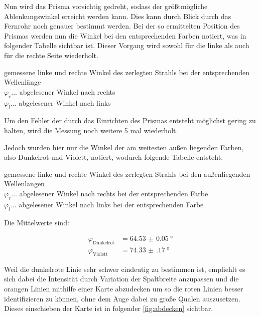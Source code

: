 \documentclass[11pt,ngerman]{scrartcl}
\begin{document}
Nun wird das Prisma vorsichtig gedreht, sodass der größtmögliche
Ablenkungswinkel erreicht werden kann. Dies kann durch Blick durch das Fernrohr
noch genauer bestimmt werden. Bei der so ermittelten Position des Prismas
werden nun die Winkel bei den entsprechenden Farben notiert, was in folgender
Tabelle sichtbar ist. Dieser Vorgang wird sowohl für die linke als auch für die
rechte Seite wiederholt.

\begin{table}[H]
	\caption{gemessene linke und rechte Winkel des zerlegten Strahls bei der entsprechenden Wellenlänge\\ $\varphi_r \dots$ abgelesener Winkel nach rechts \\ $\varphi_l \dots$ abgelesener Winkel nach links}
	\centering
	\label{tab:messalle}
	
\end{table}

Um den Fehler der durch das Einrichten des Prismas entsteht möglichst gering zu halten, wird die Messung noch weitere 5 mal wiederholt.

Jedoch wurden hier nur die Winkel der am weitesten außen liegenden Farben, also Dunkelrot und Violett, notiert, wodurch folgende Tabelle entsteht.

\begin{table}[H]
	\caption{gemessene linke und rechte Winkel des zerlegten Strahls bei den außenliegenden Wellenlängen\\ $\varphi_r \dots$ abgelesener Winkel nach rechts bei der entsprechenden Farbe\\ $\varphi_l \dots$ abgelesener Winkel nach links bei der entsprechenden Farbe}
	\centering
	\label{tab:messextrem}
	
\end{table}

Die Mittelwerte sind:


\begin{align*}
	\varphi_{\text{Dunkelrot}} & = \SI{64.53(5)}{\degree}  \\
	\varphi_{\text{Violett}}   & = \SI{74.33(17)}{\degree}
\end{align*}


Weil die dunkelrote Linie sehr schwer eindeutig zu bestimmen ist, empfiehlt es sich dabei die Intensität durch Variation der Spaltbreite anzupassen und die orangen Linien mithilfe einer Karte abzudecken um so die roten Linien besser identifizieren zu können, ohne dem Auge dabei zu große Qualen auszusetzen. Dieses einschieben der Karte ist in folgender \autoref{fig:abdecken} sichtbar.
\end{document}
